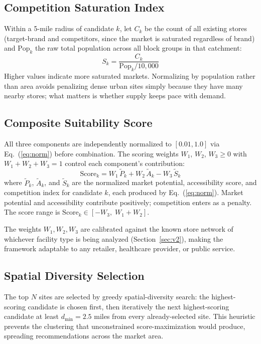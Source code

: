 \documentclass[conference]{IEEEtran}
\begin{document}
\subsection{Competition Saturation Index}

Within a 5-mile radius of candidate $k$, let $C_k$ be the count of all
existing stores (target-brand and competitors, since the market is
saturated regardless of brand) and $\text{Pop}_k$ the raw total
population across all block groups in that catchment:
\begin{equation}
S_k = \frac{C_k}{\text{Pop}_k / 10{,}000}
\label{eq:competition}
\end{equation}
Higher values indicate more saturated markets.  Normalizing by
population rather than area avoids penalizing dense urban sites simply
because they have many nearby stores; what matters is whether supply
keeps pace with demand.

\subsection{Composite Suitability Score}

All three components are independently normalized to $[0.01, 1.0]$ via
Eq.~(\ref{eq:norm}) before combination.  The scoring weights $W_1$,
$W_2$, $W_3 \geq 0$ with $W_1 + W_2 + W_3 = 1$ control each
component's contribution:
\begin{equation}
\text{Score}_k
  = W_1\,\widetilde{P}_k
  + W_2\,\widetilde{A}_k
  - W_3\,\widetilde{S}_k
\label{eq:score}
\end{equation}
where $\widetilde{P}_k$, $\widetilde{A}_k$, and $\widetilde{S}_k$ are
the normalized market potential, accessibility score, and competition
index for candidate $k$, each produced by Eq.~(\ref{eq:norm}).  Market
potential and accessibility contribute positively; competition enters
as a penalty.  The score range is $\text{Score}_k \in [-W_3,\;
W_1 + W_2]$.

The weights $W_1, W_2, W_3$ are calibrated against the known store
network of whichever facility type is being analyzed
(Section~\ref{sec:v2}), making the framework adaptable to any retailer,
healthcare provider, or public service.

\subsection{Spatial Diversity Selection}

The top $N$ sites are selected by greedy spatial-diversity search: the
highest-scoring candidate is chosen first, then iteratively the next
highest-scoring candidate at least $d_{\min} = 2.5$ miles from every
already-selected site.  This heuristic prevents the clustering that
unconstrained score-maximization would produce, spreading
recommendations across the market area.
\end{document}
